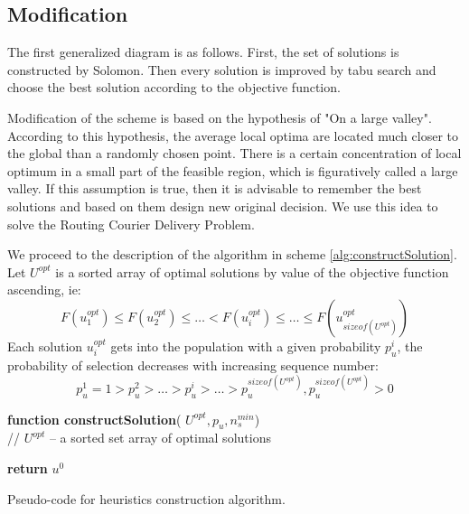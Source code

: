 \documentclass[]{TAACpaper}
\begin{document}
\subsection{Modification}

The first generalized diagram is as follows. First, the set of solutions is constructed by Solomon. Then every solution is improved by tabu search and choose the best solution according to the objective function.

Modification of the scheme is based on the hypothesis of "On a large valley"\cite{opt_Kochetov}. According to this hypothesis, the average local optima are located much closer to the global than a randomly chosen point. There is a certain concentration of local optimum in a small part of the feasible region, which is figuratively called a large valley. If this assumption is true, then it is advisable to remember the best solutions and based on them design new original decision. We use this idea to solve the  Routing Courier Delivery Problem.

We proceed to the description of the algorithm in scheme \ref{alg:constructSolution}. Let $U^{opt}$ is a sorted array of optimal solutions by value of the objective function ascending,  ie:
\begin{equation} \label{u_sorted}
F(u^{opt}_1) \leq F(u^{opt}_2) \leq \ldots < F(u^{opt}_i) \leq \ldots \leq F(u^{opt}_{sizeof(U^{opt})})
\end{equation}
Each solution $u^{opt}_i$ gets into the population with a given probability $p^i_u$, the probability of selection decreases with increasing sequence number:
\begin{equation} \label{p_sorted}
p^1_u = 1 > p^2_u > \ldots > p^i_u> \ldots   > p^{sizeof(U^{opt})}_u,  p^{sizeof(U^{opt})}_u > 0
\end{equation}

\begin{algorithm}[H]

	\textbf{function constructSolution}( $U^{opt}, p_u, n^{min}_s$) \\
	// $U^{opt}$ -- a sorted set array of optimal solutions \\
	
	
	
	
	
	\textbf{return} $u^0$
	
	\caption{Pseudo-code for heuristics construction algorithm.}
	\label{alg:constructSolution}
\end{algorithm}
\end{document}
